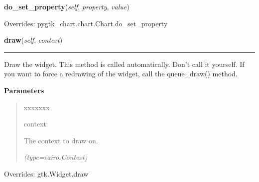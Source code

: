 \hspace{.8\funcindent}\begin{boxedminipage}{\funcwidth}

    \raggedright \textbf{do\_set\_property}(\textit{self}, \textit{property}, \textit{value})

\setlength{\parskip}{2ex}
\setlength{\parskip}{1ex}
      Overrides: pygtk\_chart.chart.Chart.do\_set\_property

    \end{boxedminipage}

    \vspace{0.5ex}

\hspace{.8\funcindent}\begin{boxedminipage}{\funcwidth}

    \raggedright \textbf{draw}(\textit{self}, \textit{context})

    \vspace{-1.5ex}

    \rule{\textwidth}{0.5\fboxrule}
\setlength{\parskip}{2ex}
    Draw the widget. This method is called automatically. Don't call it 
    yourself. If you want to force a redrawing of the widget, call the 
    queue\_draw() method.

\setlength{\parskip}{1ex}
      \textbf{Parameters}
      \vspace{-1ex}

      \begin{quote}
        \begin{Ventry}{xxxxxxx}

          \item[context]

          The context to draw on.

            {\it (type=cairo.Context)}

        \end{Ventry}

      \end{quote}

      Overrides: gtk.Widget.draw

    \end{boxedminipage}

    \label{pygtk_chart:pie_chart:PieChart:add_area}

    \vspace{0.5ex}

